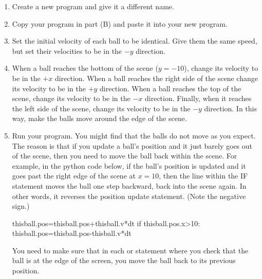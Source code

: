 \begin{description}
\begin{enumerate}
	\item Create a new program and give it a different name. 
	\item Copy your program in part (B) and paste it into your new program.
	\item Set the initial velocity of each ball to be identical. Give them the same speed, but set their velocities to be in the $-y$ direction.
	\item When a ball reaches the bottom of the scene ($y=-10$), change its velocity to be in the $+x$ direction. When a ball reaches the right side of the scene change its velocity to be in the $+y$ direction. When a ball reaches the top of the scene, change its velocity to be in the $-x$ direction. Finally, when it reaches the left side of the scene, change its velocity to be in the $-y$ direction. In this way, make the balls move around the edge of the scene.\\
	\item Run your program. You might find that the balls do not move as you expect. The reason is that if you update a ball's position and it just barely goes out of the scene, then you need to move the ball back within the scene. For example, in the python code below, if the ball's position is updated and it goes past the right edge of the scene at $x=10$, then the line within the IF statement moves the ball one step backward, back into the scene again. In other words, it reverses the position update statement. (Note the negative sign.)

\begin{myvpython}
        thisball.pos=thisball.pos+thisball.v*dt
        if thisball.pos.x>10:
            thisball.pos=thisball.pos-thisball.v*dt
\end{myvpython}

You need to make sure that in each  or  statement where you check that the ball is at the edge of the screen, you move the ball back to its previous position.
	
\end{enumerate}

\end{description}

